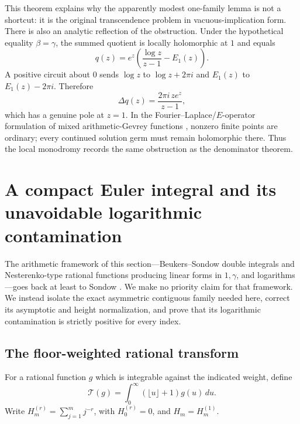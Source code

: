 \documentclass[11pt]{article}
\theoremstyle{definition}
\theoremstyle{remark}
\begin{document}
This theorem explains why the apparently modest one-family lemma is not a
shortcut: it is the original transcendence problem in vacuous-implication
form.  There is also an analytic reflection of the obstruction.  Under the
hypothetical equality \(\beta=\gamma\), the summed quotient is locally
holomorphic at \(1\) and equals
\begin{equation}\label{eq:q-monodromy}
 q(z)=e^z\left(\frac{\log z}{z-1}-E_1(z)\right).
\end{equation}
A positive circuit about \(0\) sends \(\log z\) to \(\log z+2\pi i\) and
\(E_1(z)\) to \(E_1(z)-2\pi i\).  Therefore
\[
 \Delta q(z)=\frac{2\pi i\,ze^z}{z-1},
\]
which has a genuine pole at \(z=1\).  In the Fourier--Laplace/\(E\)-operator
formulation of mixed arithmetic-Gevrey functions
\cite{Andre2000,FR2024ED}, nonzero finite points are ordinary; every
continued solution germ must remain holomorphic there.  Thus
the local monodromy records the same obstruction as the denominator theorem.

\section{A compact Euler integral and its unavoidable logarithmic
contamination}
\label{sec:compact-integral-contamination}

The arithmetic framework of this section---Beukers--Sondow double
integrals and Nesterenko-type rational functions producing linear forms in
\(1,\gamma\), and logarithms---goes back at least to Sondow
\cite{Sondow2003Criteria,Sondow2009Hypergeometric}.  We make no priority
claim for that framework.  We instead isolate the exact asymmetric
contiguous family needed here, correct its asymptotic and height
normalization, and prove that its logarithmic contamination is strictly
positive for every index.

\subsection{The floor-weighted rational transform}

For a rational function \(g\) which is integrable against the indicated
weight, define
\begin{equation}\label{eq:floor-transform}
 \mathcal T(g)=\int_0^\infty(\lfloor u\rfloor+1)g(u)\,du.
\end{equation}
Write \(H_m^{(r)}=\sum_{j=1}^m j^{-r}\), with \(H_0^{(r)}=0\), and
\(H_m=H_m^{(1)}\).
\end{document}

